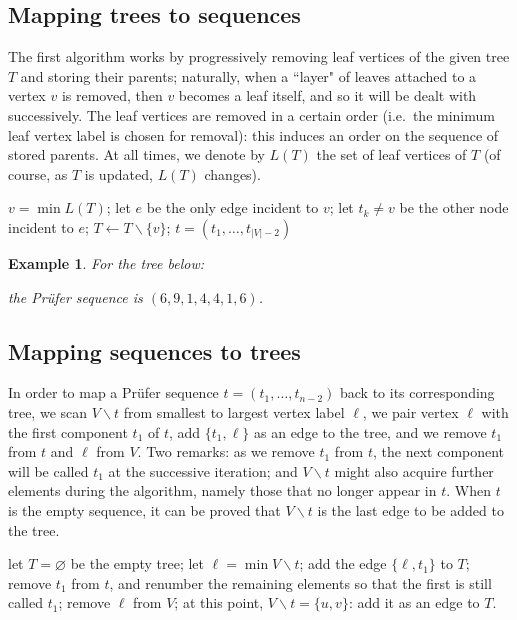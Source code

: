 \documentclass[a4paper]{book}
\theoremstyle{changebreak}                %
\newtheorem{eg}[result]{Example}
\begin{document}
\subsection{Mapping trees to sequences}
The first algorithm works by progressively removing
leaf vertices of the given tree $T$ and storing
their parents; naturally, when a ``layer" of
leaves attached to a vertex $v$ is removed, then
$v$ becomes a leaf itself, and so it will be dealt with
successively. The leaf vertices are removed in a certain
order (i.e.~the minimum leaf vertex label is
chosen for removal): this induces an order on the sequence of stored
parents. At all times, we denote by $L(T)$ the set of leaf vertices of
$T$ (of course, as $T$ is updated, $L(T)$ changes).
\begin{algorithmic}
  \STATE $v=\min L(T)$;
  \STATE let $e$ be the only edge incident to $v$;
  \STATE let $t_k\not=v$ be the other node incident to $e$;
  \STATE $T\leftarrow T\smallsetminus\{v\}$;
\ENDFOR
\RETURN $t=(t_1,\ldots,t_{|V|-2})$
\end{algorithmic}

\begin{eg}
For the tree below:
\begin{center}
\end{center}
the Pr\"ufer sequence is $(6,9,1,4,4,1,6)$.
\end{eg}

\subsection{Mapping sequences to trees}
\label{s:tree:pruferseq}
In order to map a Pr\"ufer sequence
$t=(t_1,\ldots,t_{n-2})$ back to its corresponding tree, we scan
$V\smallsetminus t$ from smallest to largest vertex
label $\ell$, we pair vertex $\ell$ with the first
component $t_1$ of $t$, add $\{t_1,\ell\}$ as an edge to the tree, and
we remove $t_1$ from $t$ and $\ell$ from $V$. Two remarks: as we
remove $t_1$ from $t$, the next component will be called $t_1$ at the
successive iteration; and $V\smallsetminus
t$ might also acquire further elements during the algorithm, namely
those that no longer appear in $t$. When $t$ is the empty
sequence, it can be proved that $V\smallsetminus
t$ is the last edge to be added to the tree.
\begin{algorithmic}
\STATE let $T=\varnothing$ be the empty tree;
  \STATE let $\ell=\min V\smallsetminus t$;
  \STATE add the edge $\{\ell,t_1\}$ to $T$;
  \STATE remove $t_1$ from $t$, and renumber the remaining elements so
  that the first is still called $t_1$;
  \STATE remove $\ell$ from $V$;
\ENDWHILE
\STATE at this point, $V\smallsetminus t=\{u,v\}$: add it as an edge to $T$.
\end{algorithmic}
\end{document}
